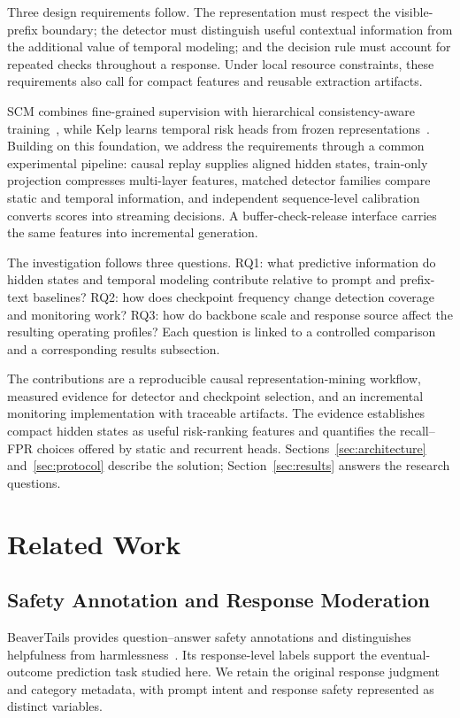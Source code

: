 Three design requirements follow. The representation must respect the visible-prefix boundary; the detector must distinguish useful contextual information from the additional value of temporal modeling; and the decision rule must account for repeated checks throughout a response. Under local resource constraints, these requirements also call for compact features and reusable extraction artifacts.

SCM combines fine-grained supervision with hierarchical consistency-aware training~\cite{NEURIPS2025_4e315702}, while Kelp learns temporal risk heads from frozen representations~\cite{li2025kelpstreamingsafeguardlarge}. Building on this foundation, we address the requirements through a common experimental pipeline: causal replay supplies aligned hidden states, train-only projection compresses multi-layer features, matched detector families compare static and temporal information, and independent sequence-level calibration converts scores into streaming decisions. A buffer-check-release interface carries the same features into incremental generation.

The investigation follows three questions. RQ1: what predictive information do hidden states and temporal modeling contribute relative to prompt and prefix-text baselines? RQ2: how does checkpoint frequency change detection coverage and monitoring work? RQ3: how do backbone scale and response source affect the resulting operating profiles? Each question is linked to a controlled comparison and a corresponding results subsection.

The contributions are a reproducible causal representation-mining workflow, measured evidence for detector and checkpoint selection, and an incremental monitoring implementation with traceable artifacts. \AchievementScopeEN{} The evidence establishes compact hidden states as useful risk-ranking features and quantifies the recall--FPR choices offered by static and recurrent heads. Sections~\ref{sec:architecture} and~\ref{sec:protocol} describe the solution; Section~\ref{sec:results} answers the research questions.

\section{Related Work}
\subsection{Safety Annotation and Response Moderation}
BeaverTails provides question--answer safety annotations and distinguishes helpfulness from harmlessness~\cite{ji2023beavertails}. Its response-level labels support the eventual-outcome prediction task studied here. We retain the original response judgment and category metadata, with prompt intent and response safety represented as distinct variables.


